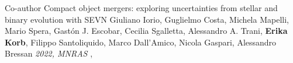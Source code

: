 %
%
%

\begin{experiences}
    \publicationtags
    {Co-author}   {Compact object mergers: exploring uncertainties from stellar and binary evolution with SEVN}
    {Giuliano Iorio, Guglielmo Costa, Michela Mapelli, Mario Spera, Gastón J. Escobar, Cecilia Sgalletta, Alessandro A. Trani, \textbf{Erika Korb}, Filippo Santoliquido, Marco Dall'Amico, Nicola Gaspari, Alessandro Bressan}
    {\textit{2022, MNRAS}}
    { ,    }      
\end{experiences}
